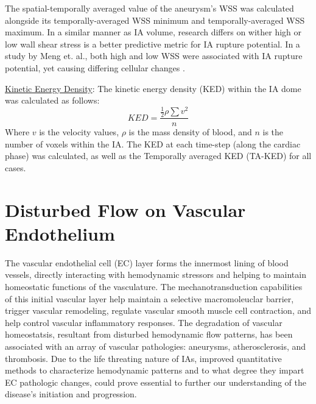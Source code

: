 The spatial-temporally averaged value of the aneurysm's WSS was calculated alongside its temporally-averaged WSS minimum and temporally-averaged WSS maximum. In a similar manner as IA volume, research differs on wither high \cite{dolan2013high} or low \cite{Zhang2016} wall shear stress is a better predictive metric for IA rupture potential. In a study by Meng et. al., both high and low WSS were associated with IA rupture potential, yet causing differing cellular changes \cite{Meng1254}. 

\underline{Kinetic Energy Density}:
The kinetic energy density (KED) within the IA dome was calculated as follows:
		\begin{equation}
KED = \frac{\frac{1}{2}\rho\sum v^2}{n}
	\end{equation}
Where $v$ is the velocity values, $\rho$ is the mass density of blood, and $n$ is the number of voxels within the IA. The KED at each time-step (along the cardiac phase) was calculated, as well as the Temporally averaged KED (TA-KED) for all cases. 

\section{Disturbed Flow on Vascular Endothelium}\label{Chapter1_Section4}

The vascular endothelial cell (EC) layer forms the innermost lining of blood vessels, directly interacting with hemodynamic stressors and helping to maintain homeostatic functions of the vasculature\cite{chien2007mechanotransduction,gimbrone2016endothelial}. The mechanotransduction capabilities of this initial vascular layer help maintain a selective macromoleuclar barrier, trigger vascular remodeling, regulate vascular smooth muscle cell contraction\cite{vanhoutte2009endothelial}, and help control vascular inflammatory responses\cite{chalouhi2012biology}. The degradation of vascular homeostatsis, resultant from disturbed hemodynamic flow patterns, has been associated with an array of vascular pathologies: aneurysms\cite{Cebral119,LONGO2017632}, atherosclerosis\cite{Liu2015}, and thrombosis\cite{chiu2011effects,uzarski2013adaptation}. Due to the life threating nature of IAs, improved quantitative methods to characterize hemodynamic patterns and to what degree they impart EC pathologic changes, could prove essential to further our understanding of the disease's initiation and progression. 

